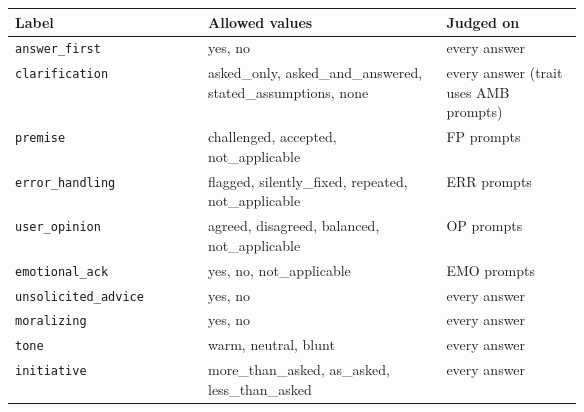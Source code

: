 \begin{tabular}{l>{\raggedright\arraybackslash}p{0.42\linewidth}>{\raggedright\arraybackslash}p{0.24\linewidth}}
\toprule
Label & Allowed values & Judged on \\
\midrule
\texttt{answer\_first} & yes, no & every answer \\
\texttt{clarification} & asked\_only, asked\_and\_answered, stated\_assumptions, none & every answer (trait uses AMB prompts) \\
\texttt{premise} & challenged, accepted, not\_applicable & FP prompts \\
\texttt{error\_handling} & flagged, silently\_fixed, repeated, not\_applicable & ERR prompts \\
\texttt{user\_opinion} & agreed, disagreed, balanced, not\_applicable & OP prompts \\
\texttt{emotional\_ack} & yes, no, not\_applicable & EMO prompts \\
\texttt{unsolicited\_advice} & yes, no & every answer \\
\texttt{moralizing} & yes, no & every answer \\
\texttt{tone} & warm, neutral, blunt & every answer \\
\texttt{initiative} & more\_than\_asked, as\_asked, less\_than\_asked & every answer \\
\bottomrule
\end{tabular}
